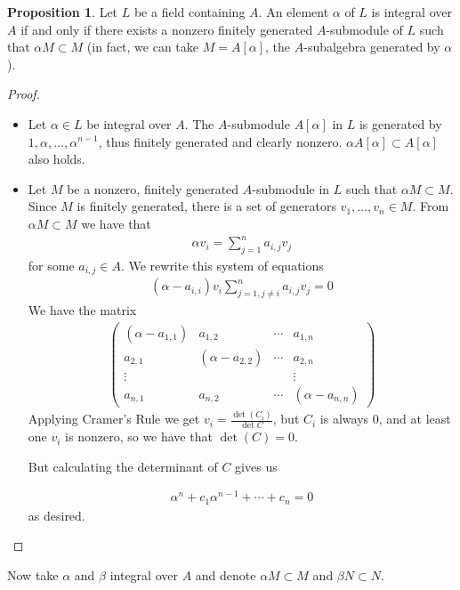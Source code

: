 \documentclass[a4paper]{book}
\theoremstyle{definition}
\newtheorem{proposition}[definition]{Proposition}
\begin{document}
\begin{thmbox}
    \begin{proposition}
        Let \(L\) be a field containing \(A\). An element \(\alpha\) of \(L\) is integral over \(A\) if and only if there exists a nonzero finitely generated \(A\)-submodule of \(L\) such that \(\alpha M \subset M\) (in fact, we can take \(M = A[\alpha]\), the \(A\)-subalgebra generated by \(\alpha\)).
    \end{proposition}
\end{thmbox}
\begin{proof}
    \begin{itemize}
        \item Let \(\alpha \in L\) be integral over \(A\). The \(A\)-submodule \(A[\alpha]\) in \(L\) is generated by \(1, \alpha, \ldots, \alpha^{n-1}\), thus finitely generated and clearly nonzero. \(\alpha A[\alpha] \subset A[\alpha]\) also holds.
        \item Let \(M\) be a nonzero, finitely generated \(A\)-submodule in \(L\) such that \(\alpha M \subset M\). Since \(M\) is finitely generated, there is a set of generators \(v_1, \ldots, v_n \in M\). From \(\alpha M \subset M\) we have that
        \begin{align*}
            \alpha v_i = \sum_{j = 1}^n a_{i, j} v_j
        \end{align*}
        for some \(a_{i, j} \in A\). We rewrite this system of equations
        \begin{align*}
            (\alpha - a_{i, i}) v_i \sum_{j = 1, j \neq i}^n a_{i, j} v_j = 0
        \end{align*}
        We have the matrix
        \begin{align*}
            \begin{pmatrix}
                (\alpha - a_{1, 1}) & a_{1, 2} & \cdots & a_{1, n}\\
                a_{2,1} & (\alpha - a_{2, 2}) & \cdots & a_{2, n} \\
                \vdots & & & \vdots \\
                a_{n, 1} & a_{n, 2} & \cdots & (\alpha - a_{n,n})
            \end{pmatrix}
        \end{align*}
        Applying Cramer's Rule we get \(v_i = \frac{\det(C_i)}{\det{C}}\), but \(C_i\) is always \(0\), and at least one \(v_i\) is nonzero, so we have that \(\det(C) = 0\).

        But calculating the determinant of \(C\) gives us

        \begin{align*}
            \alpha^n + c_1 \alpha^{n-1} + \cdots + c_n = 0
        \end{align*}
        as desired.
    \end{itemize}
\end{proof}
Now take \(\alpha\) and \(\beta\) integral over \(A\) and denote \(\alpha M \subset M\) and \(\beta N \subset N\).
\end{document}
